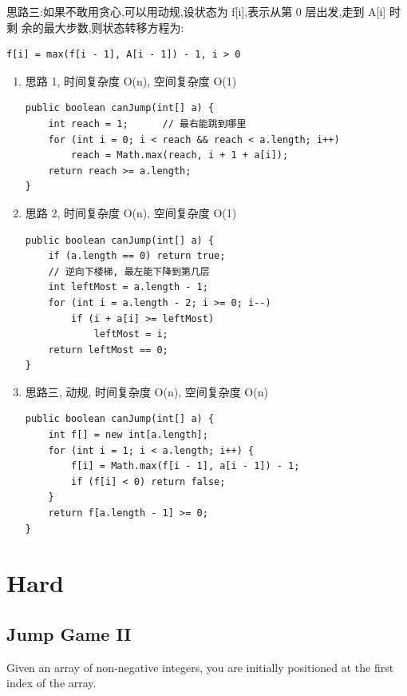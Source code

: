 \documentclass[12pt]{book}
\begin{document}
思路三:如果不敢用贪心,可以用动规,设状态为 f[i],表示从第 0 层出发,走到 A[i] 时剩
余的最大步数,则状态转移方程为:
\lstset{language=java,label= ,caption= ,numbers=none}
\begin{lstlisting}
f[i] = max(f[i - 1], A[i - 1]) - 1, i > 0
\end{lstlisting}
\begin{enumerate}
\item 思路 1, 时间复杂度 O(n), 空间复杂度 O(1)
\label{sec-13-1-4-1}
\lstset{language=java,label= ,caption= ,numbers=none}
\begin{lstlisting}
public boolean canJump(int[] a) {
    int reach = 1;      // 最右能跳到哪里
    for (int i = 0; i < reach && reach < a.length; i++) 
        reach = Math.max(reach, i + 1 + a[i]);
    return reach >= a.length;
}
\end{lstlisting}
\item 思路 2, 时间复杂度 O(n), 空间复杂度 O(1)
\label{sec-13-1-4-2}

\lstset{language=java,label= ,caption= ,numbers=none}
\begin{lstlisting}
public boolean canJump(int[] a) {
    if (a.length == 0) return true;
    // 逆向下楼梯, 最左能下降到第几层
    int leftMost = a.length - 1;
    for (int i = a.length - 2; i >= 0; i--) 
        if (i + a[i] >= leftMost)
            leftMost = i;
    return leftMost == 0;
}
\end{lstlisting}
\item 思路三, 动规, 时间复杂度 O(n), 空间复杂度 O(n)
\label{sec-13-1-4-3}
\lstset{language=java,label= ,caption= ,numbers=none}
\begin{lstlisting}
public boolean canJump(int[] a) {
    int f[] = new int[a.length];
    for (int i = 1; i < a.length; i++) {
        f[i] = Math.max(f[i - 1], a[i - 1]) - 1;
        if (f[i] < 0) return false;
    }
    return f[a.length - 1] >= 0;
}
\end{lstlisting}
\end{enumerate}

\section{Hard}
\label{sec-13-2}
\subsection{Jump Game II}
\label{sec-13-2-1}
Given an array of non-negative integers, you are initially positioned at the first index of the array.
\end{document}

